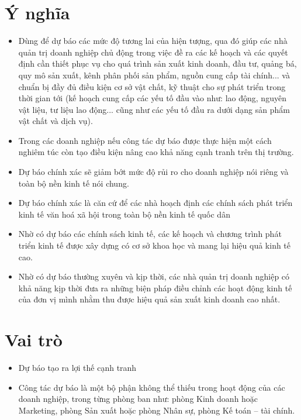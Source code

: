 \section{Ý nghĩa}
\label{sec:intro:ynghia}
\begin{itemize}
    \item Dùng để dự báo các mức độ tương lai của hiện tượng, qua đó giúp các nhà quản trị doanh nghiệp chủ động trong việc đề ra các kế hoạch và các quyết định cần thiết phục vụ cho quá trình sản xuất kinh doanh, đầu tư, quảng bá, quy mô sản xuất, kênh phân phối sản phẩm, nguồn cung cấp tài chính... và chuẩn bị đầy đủ điều kiện cơ sở vật chất, kỹ thuật cho sự phát triển trong thời gian tới (kế hoạch cung cấp các yếu tố đầu vào như: lao động, nguyên vật liệu, tư liệu lao động... cũng như các yếu tố đầu ra dưới dạng sản phẩm vật chất và dịch vụ). \\
    \item Trong các doanh nghiệp nếu công tác dự báo được thực hiện một cách nghiêm túc còn tạo điều kiện nâng cao khả năng cạnh tranh trên thị trường.\\
    \item Dự báo chính xác sẽ giảm bớt mức độ rủi ro cho doanh nghiệp nói riêng và toàn bộ nền kinh tế nói chung. \\
    \item Dự báo chính xác là căn cứ để các nhà hoạch định các chính sách phát triển kinh tế văn hoá xã hội trong toàn bộ nền kinh tế quốc dân \\
    \item Nhờ có dự báo các chính sách kinh tế, các kế hoạch và chương trình phát triển kinh tế được xây dựng có cơ sở khoa học và mang lại hiệu quả kinh tế cao.\\
    \item Nhờ có dự báo thường xuyên và kịp thời, các nhà quản trị doanh nghiệp có khả năng kịp thời đưa ra những biện pháp điều chỉnh các hoạt động kinh tế của đơn vị mình nhằm thu được hiệu quả sản xuất kinh doanh cao nhất. \\
\end{itemize}
\section{Vai trò}
\label{sec:intro:vaitro}
\begin{itemize}
    \item Dự báo tạo ra lợi thế cạnh tranh \\
    \item Công tác dự báo là một bộ phận không thể thiếu trong hoạt động của các doanh nghiệp, trong từng phòng ban như: phòng Kinh doanh hoặc Marketing, phòng Sản xuất hoặc phòng Nhân sự, phòng Kế toán – tài chính. \\
\end{itemize}
